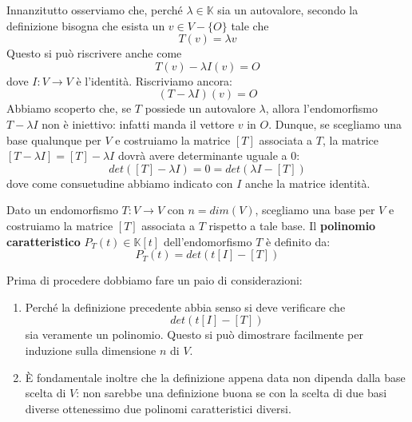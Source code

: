 Innanzitutto osserviamo che, perch\'e $\lambda \in \mathbb{K}$ sia un
autovalore, secondo la definizione bisogna che esista un $v \in V - \{O\}$
tale che
\begin{equation*}
	T(v) = \lambda v
\end{equation*}
Questo si pu\`o riscrivere anche come
\begin{equation*}
	T(v) - \lambda I(v) = O
\end{equation*}
dove $I : V \to V$ \`e l'identit\`a. Riscriviamo ancora:
\begin{equation*}
	(T - \lambda I)(v) = O
\end{equation*}
Abbiamo scoperto che, se $T$ possiede un autovalore $\lambda$, allora
l'endomorfismo $T - \lambda I$ non \`e iniettivo: infatti manda il vettore
$v$ in $O$. Dunque, se scegliamo una base qualunque per $V$ e costruiamo la
matrice $[T]$ associata a $T$, la matrice $[T - \lambda I] = [T] - \lambda I$
dovr\`a avere determinante uguale a 0:
\begin{equation*}
	det([T] - \lambda I) = 0 = det(\lambda I - [T])
\end{equation*}
dove come consuetudine abbiamo indicato con $I$ anche la matrice identit\`a.

\begin{definition}
	Dato un endomorfismo $T : V \to V$ con $n = dim(V)$, scegliamo una base
	per $V$ e costruiamo la matrice $[T]$ associata a $T$ rispetto a tale
	base. Il \textbf{polinomio caratteristico} $P_T(t) \in \mathbb{K}[t]$
	dell'endomorfismo $T$ \`e definito da:
	\begin{equation*}
		P_T(t) = det(t[I] - [T])
	\end{equation*}
\end{definition}

\begin{observation}
	Prima di procedere dobbiamo fare un paio di considerazioni:
	\begin{enumerate}
		\item Perch\'e la definizione precedente abbia senso si deve verificare
		      che \[det(t[I] - [T])\] sia veramente un polinomio. Questo si pu\`o
		      dimostrare facilmente per induzione sulla dimensione
		      $n$ di $V$.
		\item \`E fondamentale inoltre che la definizione appena data non dipenda
		      dalla base scelta di $V$: non sarebbe una definizione buona se con
		      la scelta di due basi diverse ottenessimo due polinomi
		      caratteristici diversi.
	\end{enumerate}
\end{observation}

